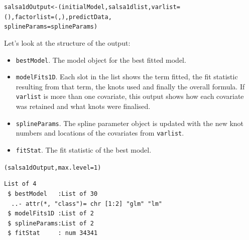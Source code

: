 \begin{frame}[fragile]
\begin{knitrout}
\begin{kframe}
\begin{alltt}
\end{alltt}
\end{kframe}
\end{knitrout}

\begin{knitrout}\footnotesize
{}\color{fgcolor}\begin{kframe}
\begin{alltt}
salsa1dOutput <- (initialModel, salsa1dlist, varlist=
    (), factorlist=(, ), predictData, 
    splineParams=splineParams)
\end{alltt}
\end{kframe}
\end{knitrout}

\end{frame}

\begin{frame}[fragile]
\noindent Let's look at the structure of the output: 
\begin{itemize}
\item {\tt bestModel}. The model object for the best fitted model.
\item {\tt modelFits1D}.  Each slot in the list shows the term fitted, the fit statistic resulting from that term, the knots used and finally the overall formula.  If {\tt varlist} is more than one covariate, this output shows how each covariate was retained and what knots were finalised.
\item {\tt splineParams}.  The spline parameter object is updated with the new knot numbers and locations of the covariates from {\tt varlist}.
\item {\tt fitStat}.  The fit statistic of the best model.
\end{itemize}

\begin{knitrout}\footnotesize
{}\color{fgcolor}\begin{kframe}
\begin{alltt}
(salsa1dOutput, max.level = 1)
\end{alltt}
\begin{verbatim}
List of 4
 $ bestModel   :List of 30
  ..- attr(*, "class")= chr [1:2] "glm" "lm"
 $ modelFits1D :List of 2
 $ splineParams:List of 2
 $ fitStat     : num 34341
\end{verbatim}
\end{kframe}
\end{knitrout}
\end{frame}

